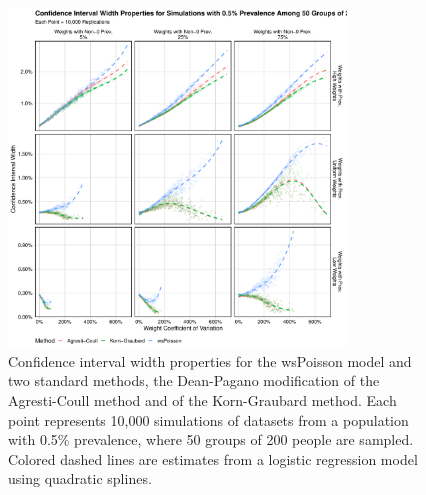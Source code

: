 \begin{figure}
\centering
\includegraphics[width=0.8\textwidth]{perfect_confidence_interval_width_50_groups_0_005_prev}
\caption{Confidence interval width properties for the wsPoisson model and two standard methods, the Dean-Pagano modification of the Agresti-Coull method and of the Korn-Graubard method.
Each point represents 10,000 simulations of datasets from a population with 0.5\% prevalence, where 50 groups of 200 people are sampled.
Colored dashed lines are estimates from a logistic regression model using quadratic splines.}
\label{ch_3:fig:perfect_confidence_interval_width_50_groups_0_005_prev}
\end{figure}


